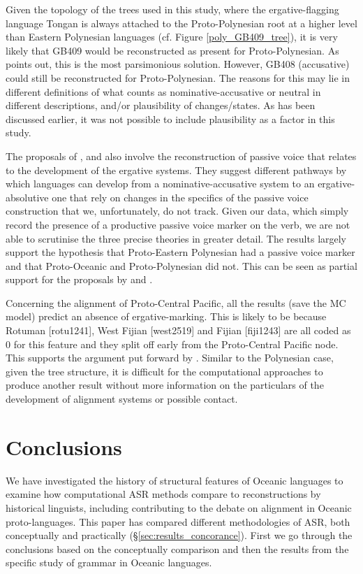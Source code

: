 \documentclass[12pt,letterpaper]{article}
\begin{document}
Given the topology of the trees used in this study, where the ergative-flagging language Tongan is always attached to the Proto-Polynesian root at a higher level than Eastern Polynesian languages (cf. Figure \ref{poly_GB409_tree}), it is very likely that GB409 would be reconstructed as present for Proto-Polynesian. As \citeauthor{clark1973aspects} points out, this is the most parsimonious solution. However, GB408 (accusative) could still be reconstructed for Proto-Polynesian. The reasons for this may lie in different definitions of what counts as nominative-accusative or neutral in different descriptions, and/or plausibility of changes/states. As has been discussed earlier, it was not possible to include plausibility as a factor in this study.

The proposals of \citet{hale_1968}, \citet{hohepa_1967, hohepa_1969} and \citet{chung1978} also involve the reconstruction of passive voice that relates to the development of the ergative systems. They suggest different pathways by which languages can develop from a nominative-accusative system to an ergative-absolutive one that rely on changes in the specifics of the passive voice construction that we, unfortunately, do not track. Given our data, which simply record the presence of a productive passive voice marker on the verb, we are not able to scrutinise the three precise theories in greater detail. The results largely support the hypothesis that Proto-Eastern Polynesian had a passive voice marker and that Proto-Oceanic and Proto-Polynesian did not. This can be seen as partial support for the proposals by \citet{hale_1968, hohepa_1967, hohepa_1969} and \citet{chung1978}.

Concerning the alignment of Proto-Central Pacific, all the results (save the MC model) predict an absence of ergative-marking. This is likely to be because Rotuman [rotu1241], West Fijian [west2519] and Fijian [fiji1243] are all coded as 0 for this feature and they split off early from the Proto-Central Pacific node. This supports the argument put forward by \citet{ball2007ergativity}. Similar to the Polynesian case, given the tree structure, it is difficult for the computational approaches to produce another result without more information on the particulars of the development of alignment systems or possible contact.

\FloatBarrier
\section{Conclusions}
We have investigated the history of structural features of Oceanic languages to examine how computational ASR methods compare to reconstructions by historical linguists, including contributing to the debate on alignment in Oceanic proto-languages. This paper has compared different methodologies of ASR, both conceptually and practically (§\ref{sec:results_concorance}). First we go through the conclusions based on the conceptually comparison and then the results from the specific study of grammar in Oceanic languages.
\end{document}
